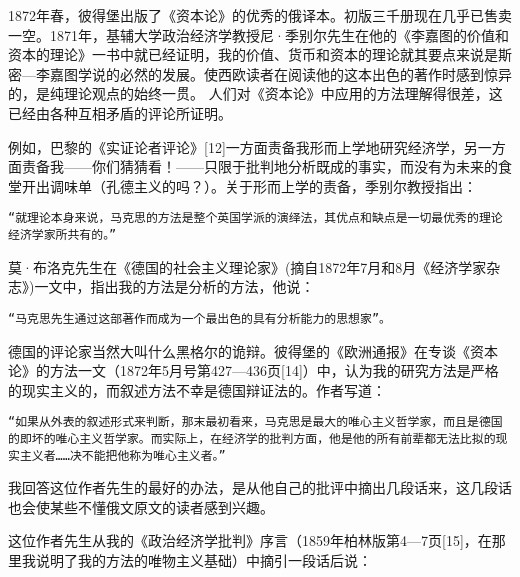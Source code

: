 \documentclass{ctexbook}
\begin{document}
1872年春，彼得堡出版了《资本论》的优秀的俄译本。初版三千册现在几乎已售卖一空。1871年，基辅大学政治经济学教授尼·季别尔先生在他的《李嘉图的价值和资本的理论》一书中就已经证明，我的价值、货币和资本的理论就其要点来说是斯密—李嘉图学说的必然的发展。使西欧读者在阅读他的这本出色的著作时感到惊异的，是纯理论观点的始终一贯。
人们对《资本论》中应用的方法理解得很差，这已经由各种互相矛盾的评论所证明。

例如，巴黎的《实证论者评论》[12]一方面责备我形而上学地研究经济学，另一方面责备我——你们猜猜看！——只限于批判地分析既成的事实，而没有为未来的食堂开出调味单（孔德主义的吗？）。关于形而上学的责备，季别尔教授指出：

\texttt{“就理论本身来说，马克思的方法是整个英国学派的演绎法，其优点和缺点是一切最优秀的理论经济学家所共有的。”}

莫·布洛克先生在《德国的社会主义理论家》(摘自1872年7月和8月《经济学家杂志》)一文中，指出我的方法是分析的方法，他说：

\texttt{“马克思先生通过这部著作而成为一个最出色的具有分析能力的思想家”。}

德国的评论家当然大叫什么黑格尔的诡辩。彼得堡的《欧洲通报》在专谈《资本论》的方法一文（1872年5月号第427—436页[14]）中，认为我的研究方法是严格的现实主义的，而叙述方法不幸是德国辩证法的。作者写道：

\texttt{“如果从外表的叙述形式来判断，那末最初看来，马克思是最大的唯心主义哲学家，而且是德国的即坏的唯心主义哲学家。而实际上，在经济学的批判方面，他是他的所有前辈都无法比拟的现实主义者……决不能把他称为唯心主义者。”}

我回答这位作者先生的最好的办法，是从他自己的批评中摘出几段话来，这几段话也会使某些不懂俄文原文的读者感到兴趣。

这位作者先生从我的《政治经济学批判》序言（1859年柏林版第4—7页[15]，在那里我说明了我的方法的唯物主义基础）中摘引一段话后说：
\end{document}

